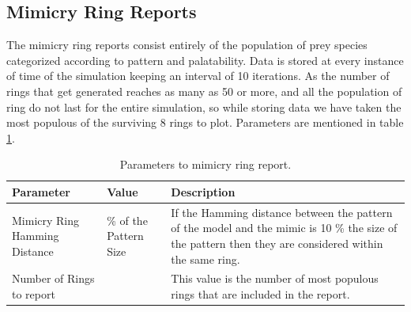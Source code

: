 \documentclass[letterpaper]{article}
\numberwithin{equation}{section}
\begin{document}
\subsection{Mimicry Ring Reports}
The mimicry ring reports consist entirely of the population of prey species categorized according to pattern and palatability. Data is stored at every instance of time of the simulation keeping an interval of 10 iterations. As the number of rings that get generated reaches as many as 50 or more, and all the population of ring do not last for the entire simulation, so while storing data we have taken the most populous of the surviving 8 rings to plot. Parameters are mentioned in table \ref{tab:ring-report-control-parameters}.

\begin{table}[h]
\centering
\setlength\tabcolsep{2pt}
\begin{tabular}{| p{2cm} | >{\centering} p{1cm} | p{5cm} |}
	\hline
		\textbf{Parameter} & \textbf{Value} & \textbf{Description} \\ \hline
		Mimicry Ring Hamming Distance & 10 \% of the Pattern Size & If the Hamming distance between the pattern of the model and the mimic is 10 \% the size of the pattern then they are considered within the same ring.\\ \hline
		Number of Rings to report & 8 & This value is the number of most populous rings that are included in the report.\\
	\hline
\end{tabular}
\caption{Parameters to mimicry ring report.}
\label{tab:ring-report-control-parameters}
\end{table}
\end{document}
